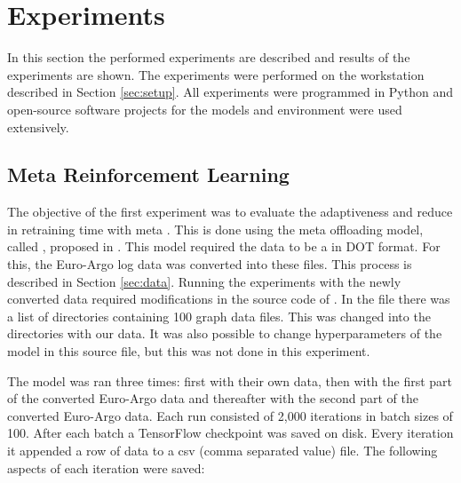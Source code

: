 \chapter{Experiments}

In this section the performed experiments are described and results of the
experiments are shown. The experiments were performed on the workstation
described in Section \ref{sec:setup}. All experiments were programmed in
Python and open-source software projects for the models and environment were
used extensively.

\section{Meta Reinforcement Learning}

The objective of the first experiment was to evaluate the adaptiveness and
reduce in retraining time with meta \rl. This is done using the meta \rl
offloading model, called \mrlco, proposed in . This model
required the data to be a \DAG in DOT format. For this, the Euro-Argo log data
was converted into these \DAG files. This process is described in Section
\ref{sec:data}. Running the experiments with the newly converted data required
modifications in the source code of \mrlco. In the 
file there was a list of directories containing 100 graph data files. This was
changed into the directories with our data. It was also possible to change
hyperparameters of the model in this source file, but this was not done in
this experiment.



The model was ran three times: first with their own data, then with the first
part of the converted Euro-Argo data and thereafter with the second part of
the converted Euro-Argo data. Each run consisted of 2,000 iterations in batch
sizes of 100. After each batch a TensorFlow checkpoint was saved on disk.
Every iteration it appended a row of data to a csv (comma separated value)
file. The following aspects of each iteration were saved:

